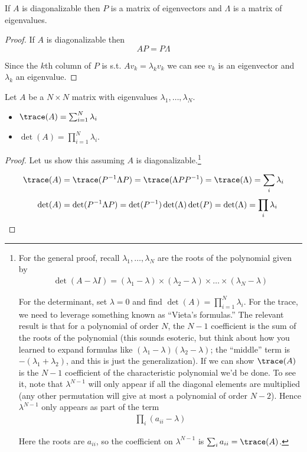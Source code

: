 \documentclass{article}
\begin{document}
\begin{claim}
  If $A$ is diagonalizable then $P$ is a matrix of eigenvectors and $\Lambda$ is a matrix of eigenvalues.
\end{claim}

\begin{proof}
  If $A$ is  diagonalizable then
  \[
    A P = P \Lambda
  \]

  Since the $k$th column of $P$ is s.t. $A v_k = \lambda_k v_k$ we can see $v_k$ is an eigenvector and $\lambda_k$ an eigenvalue.
\end{proof}

\begin{theorem}
  Let $A$ be a $N \times N$ matrix with eigenvalues $\lambda_1, \ldots, \lambda_N$.
  \begin{itemize}[label=$\bullet$]
    \item $\trace(A) = \sum^{N}_{i = 1} \lambda_i$
    \item $\det(A) = \prod_{i = 1}^N \lambda_i$.
  \end{itemize}
\end{theorem}

\begin{proof}
  Let us show this assuming $A$ is diagonalizable.\footnote{
    For the general proof, recall $\lambda_1, \ldots, \lambda_N$ are the roots of the polynomial given by
    \begin{align*}
      \det(A - \lambda I)
      =
      (\lambda_1 - \lambda)
      \times
      (\lambda_2 - \lambda)
      \times
      \ldots
      \times
      (\lambda_N - \lambda)
    \end{align*}

    For the determinant, set $\lambda = 0$ and find $\det(A) = \prod_{i = 1}^N \lambda_i$. For the trace, we need to leverage something known as ``Vieta's formulas.'' The relevant result is that for a polynomial of order $N$, the $N - 1$ coefficient is the sum of the roots of the polynomial (this sounds esoteric, but think about how you learned to expand formulas like $(\lambda_1 - \lambda) (\lambda_2 - \lambda)$; the ``middle'' term is $- (\lambda_1 + \lambda_2)$, and this is just the generalization). If we can show $\trace(A)$ is the $N - 1$ coefficient of the characteristic polynomial we'd be done. To see it, note that $\lambda^{N - 1}$ will only appear if all the diagonal elements are multiplied (any other permutation will give at most a polynomial of order $N - 2$). Hence $\lambda^{N - 1}$ only appears as part of the term
    \begin{align*}
      \prod_{i} (a_{ii} - \lambda)
    \end{align*}

    Here the roots are $a_{ii}$, so the coefficient on $\lambda^{N - 1}$ is $\sum^{}_{i} a_{ii} = \trace(A)$.
  }
  \begin{align*}
    \trace(A)
    &
    = \trace(P^{-1} \Lambda P)
    = \trace(\Lambda P P^{-1})
    = \trace(\Lambda)
    = \sum^{}_{i}  \lambda_i
    \\
    \det(A)
    &
    = \det(P^{-1} \Lambda P)
    = \det(P^{-1}) \det(\Lambda) \det(P)
    = \det(\Lambda)
    = \prod^{}_{i}  \lambda_i
  \end{align*}
\end{proof}
\end{document}

